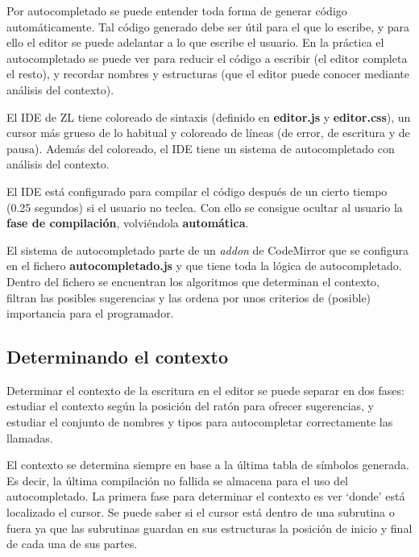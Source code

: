\documentclass{report}
\begin{document}
	Por autocompletado se puede entender toda forma de generar código automáticamente. Tal código generado debe ser útil para el que lo escribe, y para ello el editor se puede adelantar a lo que escribe el usuario. En la práctica el autocompletado se puede ver para reducir el código a escribir (el editor completa el resto), y recordar nombres y estructuras (que el editor puede conocer mediante análisis del contexto).
	
	\vspace{10px}
	
	El IDE de ZL tiene coloreado de sintaxis (definido en \textbf{editor.js} y \textbf{editor.css}), un cursor más grueso de lo habitual y coloreado de líneas (de error, de escritura y de pausa). Además del coloreado, el IDE tiene un sistema de autocompletado con análisis del contexto.
	
	\vspace{10px}
	
	El IDE está configurado para compilar el código después de un cierto tiempo (0.25 segundos) si el usuario no teclea. Con ello se consigue ocultar al usuario la \textbf{fase de compilación}, volviéndola \textbf{automática}. 
	
	\vspace{10px}
	
	El sistema de autocompletado parte de un \textit{addon} de CodeMirror que se configura en el fichero \textbf{autocompletado.js} y que tiene toda la lógica de autocompletado. Dentro del fichero se encuentran los algoritmos que determinan el contexto, filtran las posibles sugerencias y las ordena por unos criterios de (posible) importancia para el programador.
	
	\subsection{Determinando el contexto}
	
	Determinar el contexto de la escritura en el editor se puede separar en dos fases: estudiar el contexto según la posición del ratón para ofrecer sugerencias, y estudiar el conjunto de nombres y tipos para autocompletar correctamente las llamadas.
	
	\vspace{10px}
	
	El contexto se determina siempre en base a la última tabla de símbolos generada. Es decir, la última compilación no fallida se almacena para el uso del autocompletado. La primera fase para determinar el contexto es ver `donde' está localizado el cursor. Se puede saber si el cursor está dentro de una subrutina o fuera ya que las subrutinas guardan en sus estructuras la posición de inicio y final de cada una de sus partes. 
	
\end{document}
